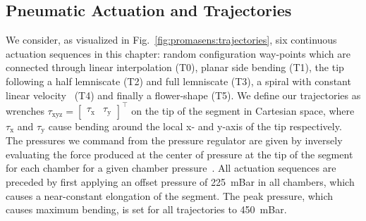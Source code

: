 \subsection{Pneumatic Actuation and Trajectories}
We consider, as visualized in Fig.~\ref{fig:promasens:trajectories}, six continuous actuation sequences in this chapter: random configuration way-points which are connected through linear interpolation (T0), planar side bending (T1), the tip following a half lemniscate (T2) and full lemniscate (T3), a spiral with constant linear velocity~\citep{carrasco2018constant} (T4) and finally a flower-shape (T5).
We define our trajectories as wrenches  $\tau_\mathrm{xyz} = \begin{bmatrix} \tau_\mathrm{x} & \tau_\mathrm{y} \end{bmatrix}^\top$ on the tip of the segment in Cartesian space, where $\tau_\mathrm{x}$ and $\tau_\mathrm{y}$ cause bending around the local x- and y-axis of the tip respectively. %
The pressures we command from the pressure regulator are given by inversely evaluating the force produced at the center of pressure at the tip of the segment for each chamber for a given chamber pressure~\citep{della2019dynamic}.
All actuation sequences are preceded by first applying an offset pressure of \SI{225}{mBar} in all chambers, which causes a near-constant elongation of the segment. The peak pressure, which causes maximum bending, is set for all trajectories to \SI{450}{mBar}.


